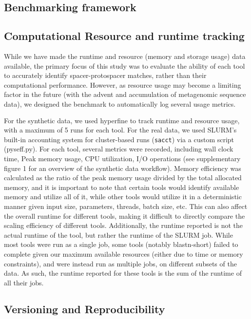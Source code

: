 \documentclass[
]{article}
\begin{document}
\subsection{Benchmarking framework}\label{sec-benchmark}

\subsection{Computational Resource and runtime
tracking}\label{sec-resource-tracking}

While we have made the runtime and resource (memory and storage usage)
data available, the primary focus of this study was to evaluate the
ability of each tool to accurately identify spacer-protospacer matches,
rather than their computational performance. However, as resource usage
may become a limiting factor in the future (with the advent and
accumulation of metagenomic sequence data), we designed the benchmark to
automatically log several usage metrics.

For the synthetic data, we used hyperfine
\autocite{Peter_hyperfine_2023} to track runtime and resource usage,
with a maximum of 5 runs for each tool. For the real data, we used
SLURM's built-in accounting system for cluster-based runs
(\texttt{sacct}) via a custom script (pyseff.py)\autocite{pyseff}. For
each tool, several metrics were recorded, including wall clock time,
Peak memory usage, CPU utilization, I/O operations (see supplementary
figure 1 for an overview of the synthetic data workflow). Memory
efficiency was calculated as the ratio of the peak memory usage divided
by the total allocated memory, and it is important to note that certain
tools would identify available memory and utilize all of it, while other
tools would utilize it in a deterministic manner given input size,
parameters, threads, batch size, etc. This can also affect the overall
runtime for different tools, making it difficult to directly compare the
scaling efficiency of different tools. Additionally, the runtime
reported is not the actual runtime of the tool, but rather the runtime
of the SLURM job. While most tools were run as a single job, some tools
(notably blastn-short) failed to complete given our maximum available
resources (either due to time or memory constraints), and were instead
run as multiple jobs, on different subsets of the data. As such, the
runtime reported for these tools is the sum of the runtime of all their
jobs.

\subsection{Versioning and Reproducibility}\label{sec-reproducibility}
\end{document}

